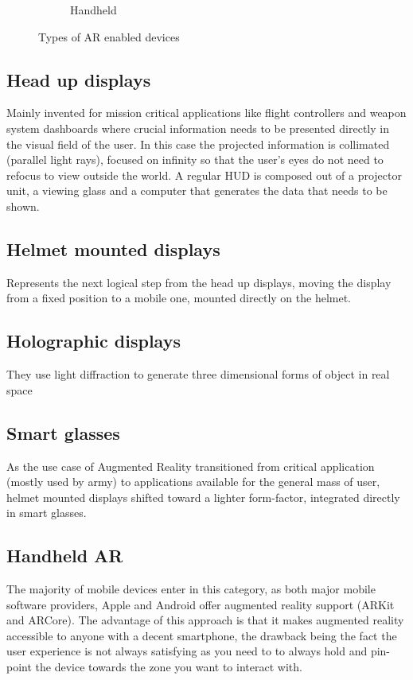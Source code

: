 \documentclass[12 pct]{report}
\begin{document}
\begin{figure}[h!]
\begin{subfigure}[b]{0.4\linewidth}
    \caption{Handheld}
  \end{subfigure}
  \caption{Types of AR enabled devices}
  \label{fig:coffee3}
\end{figure}

\subsection*{Head up displays}
Mainly invented for mission critical applications like flight controllers and weapon system dashboards where crucial information needs to be presented directly in the visual field of the user. In this case the projected information is collimated (parallel light rays), focused on infinity so that the user’s eyes do not need to refocus to view outside the world.
A regular HUD is composed out of a projector unit, a viewing glass and a computer that generates the data that needs to be shown.

\subsection*{Helmet mounted displays}
Represents the next logical step from the head up displays, moving the display from a fixed position to a mobile one, mounted directly on the helmet.

\subsection*{Holographic displays}
They use light diffraction to generate three dimensional forms of object in real space

\subsection*{Smart glasses}
As the use case of Augmented Reality transitioned from critical application (mostly used by army) to  applications available for the general mass of user, helmet mounted displays shifted toward a lighter form-factor, integrated directly in smart glasses. 

\subsection*{Handheld AR}
The majority of mobile devices enter in this category, as both major mobile software providers, Apple and Android offer augmented reality support (ARKit and ARCore). The advantage of this approach is that it makes augmented reality accessible to anyone with a decent smartphone, the drawback being the fact the user experience is not always satisfying as you need to to always hold and pin-point the device towards the zone you want to interact with.
\end{document}
